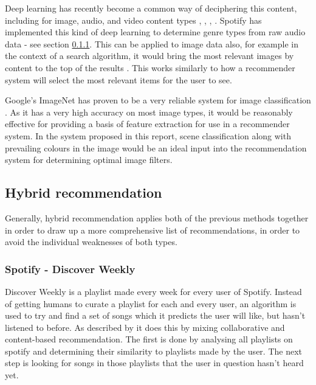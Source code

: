 \documentclass[a4paper,12pt]{article}
\begin{document}
      Deep learning has recently become a common way of deciphering this content, including for image, audio, and video content types \citep{coates2011analysis}, \citep{ciregan2012multi}, \citep{lee2009unsupervised}, \citep{mobahi2009deep}.
      Spotify has implemented this kind of deep learning to determine genre types from raw audio data - see section \ref{discoverweekly}.
      This can be applied to image data also, for example in the context of a search algorithm, it would bring the most relevant images by content to the top of the results \citep{yee2003faceted}. This works similarly to how a recommender system will select the most relevant items for the user to see.

      Google's ImageNet has proven to be a very reliable system for image classification \citep{krizhevsky2012imagenet}.
      As it has a very high accuracy on most image types, it would be reasonably effective for providing a basis of feature extraction for use in a recommender system. In the system proposed in this report, scene classification along with prevailing colours in the image would be an ideal input into the recommendation system for determining optimal image filters.


  \subsection{Hybrid recommendation}
    Generally, hybrid recommendation applies both of the previous methods together in order to draw up a more comprehensive list of recommendations, in order to avoid the individual weaknesses of both types.

    \subsubsection{Spotify - Discover Weekly}
    \label{discoverweekly}
      Discover Weekly is a playlist made every week for every user of Spotify. Instead of getting humans to curate a playlist for each and every user, an algorithm is used to try and find a set of songs which it predicts the user will like, but hasn't listened to before. As described by \cite{popper2015dw} it does this by mixing collaborative and content-based recommendation. The first is done by analysing all playlists on spotify and determining their similarity to playlists made by the user. The next step is looking for songs in those playlists that the user in question hasn't heard yet.
\end{document}
